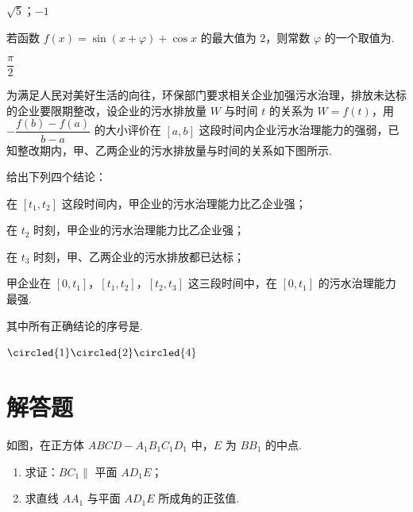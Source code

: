 \begin{answer}
\(\sqrt{5}\)；\(-1\)
\end{answer}

\begin{problem}
若函数 \(f(x)=\sin(x+\varphi)+\cos x\) 的最大值为 \(2\)，则常数 \(\varphi\) 的一个取值为\fillinblank{}.
\end{problem}

\begin{answer}
\(\dfrac{\pi}{2}\)
\end{answer}

\begin{problem}
为满足人民对美好生活的向往，环保部门要求相关企业加强污水治理，排放未达标的企业要限期整改，设企业的污水排放量 \(W\) 与时间 \(t\) 的关系为 \(W=f(t)\)，用 \(-\dfrac{f(b)-f(a)}{b-a}\) 的大小评价在 \([a,b]\) 这段时间内企业污水治理能力的强弱，已知整改期内，甲、乙两企业的污水排放量与时间的关系如下图所示.

给出下列四个结论：

\begin{circlelist}
\item 在 \([t_1,t_2]\) 这段时间内，甲企业的污水治理能力比乙企业强；

\item 在 \(t_2\) 时刻，甲企业的污水治理能力比乙企业强；

\item 在 \(t_3\) 时刻，甲、乙两企业的污水排放都已达标；

\item 甲企业在 \([0,t_1]\)，\([t_1,t_2]\)，\([t_2,t_3]\) 这三段时间中，在 \([0,t_1]\) 的污水治理能力最强.
\end{circlelist}
其中所有正确结论的序号是\fillinblank{}.

\end{problem}

\begin{answer}
\(\circled{1}\circled{2}\circled{4}\)
\end{answer}

\section{解答题}

\begin{problem}
如图，在正方体 \(ABCD-A_1B_1C_1D_1\) 中，\(E\) 为 \(BB_1\) 的中点.

\begin{enumerate}
    \item 求证：\(BC_1\parallel\) 平面 \(AD_1E\)；
    \item 求直线 \(AA_1\) 与平面 \(AD_1E\) 所成角的正弦值.
\end{enumerate}

\end{problem}

